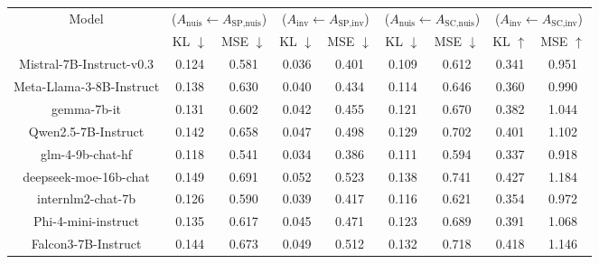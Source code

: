 \begin{table}[ht]
\centering
\small
\setlength{\tabcolsep}{4.5pt}
\renewcommand{\arraystretch}{1.2}

\begin{tabular}{c|cc|cc|cc|cc}
\hline

\multirow{2}{*}{Model}
&
\multicolumn{2}{c|}{($A_{\text{nuis}} \leftarrow A_{\text{SP,nuis}}$)}
&
\multicolumn{2}{c|}{($A_{\text{inv}} \leftarrow A_{\text{SP,inv}}$)}
&
\multicolumn{2}{c|}{($A_{\text{nuis}} \leftarrow A_{\text{SC,nuis}}$)}
&
\multicolumn{2}{c}{($A_{\text{inv}} \leftarrow A_{\text{SC,inv}}$)}
\\

&
KL $\downarrow$
&
MSE $\downarrow$
&
KL $\downarrow$
&
MSE $\downarrow$
&
KL $\downarrow$
&
MSE $\downarrow$
&
KL $\uparrow$
&
MSE $\uparrow$
\\

\hline

Mistral-7B-Instruct-v0.3
& 0.124 & 0.581
& 0.036 & 0.401
& 0.109 & 0.612
& 0.341 & 0.951
\\

Meta-Llama-3-8B-Instruct
& 0.138 & 0.630
& 0.040 & 0.434
& 0.114 & 0.646
& 0.360 & 0.990
\\

gemma-7b-it
& 0.131 & 0.602
& 0.042 & 0.455
& 0.121 & 0.670
& 0.382 & 1.044
\\

Qwen2.5-7B-Instruct
& 0.142 & 0.658
& 0.047 & 0.498
& 0.129 & 0.702
& 0.401 & 1.102
\\

glm-4-9b-chat-hf
& 0.118 & 0.541
& 0.034 & 0.386
& 0.111 & 0.594
& 0.337 & 0.918
\\

deepseek-moe-16b-chat
& 0.149 & 0.691
& 0.052 & 0.523
& 0.138 & 0.741
& 0.427 & 1.184
\\

internlm2-chat-7b
& 0.126 & 0.590
& 0.039 & 0.417
& 0.116 & 0.621
& 0.354 & 0.972
\\

Phi-4-mini-instruct
& 0.135 & 0.617
& 0.045 & 0.471
& 0.123 & 0.689
& 0.391 & 1.068
\\

Falcon3-7B-Instruct
& 0.144 & 0.673
& 0.049 & 0.512
& 0.132 & 0.718
& 0.418 & 1.146
\\

\hline


\end{tabular}
\end{table}
